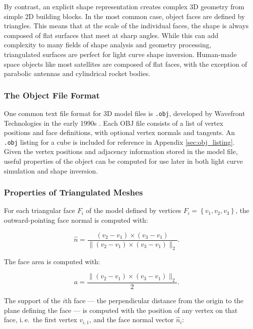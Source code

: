 By contrast, an explicit shape representation creates complex 3D geometry from simple 2D building blocks. In the most common case, object faces are defined by triangles. This means that at the scale of the individual faces, the shape is always composed of flat surfaces that meet at sharp angles. While this can add complexity to many fields of shape analysis and geometry processing, triangulated surfaces are perfect for light curve shape inversion. Human-made space objects like most satellites are composed of flat faces, with the exception of parabolic antennas and cylindrical rocket bodies.

\subsubsection{The Object File Format}

One common text file format for 3D model files is \texttt{.obj}, developed by Wavefront Technologies in the early 1990s \cite{obj_format}. Each OBJ file consists of a list of vertex positions and face definitions, with optional vertex normals and tangents. An \texttt{.obj} listing for a cube is included for reference in Appendix \ref{sec:obj_listing}. Given the vertex positions and adjacency information stored in the model file, useful properties of the object can be computed for use later in both light curve simulation and shape inversion. 

\subsubsection{Properties of Triangulated Meshes}

For each triangular face $F_i$ of the model defined by vertices $F_i = \left\{v_1, v_2, v_3\right\}$, the outward-pointing face normal is computed with:

\begin{equation} \label{eq:face_normal}
    \hat{n} = \frac{\left( v_2 - v_1 \right) \times \left( v_3 - v_1 \right)}{\| \left( v_2 - v_1 \right) \times \left( v_3 - v_1 \right) \|_2}.
\end{equation}

The face area is computed with:

\begin{equation} \label{eq:face_areas}
    a = \frac{\| \left( v_2 - v_1 \right) \times \left( v_3 - v_1 \right)\|_2}{2}.
\end{equation}

The support of the $i$th face --- the perpendicular distance from the origin to the plane defining the face --- is computed with the position of any vertex on that face, i.\,e.\, the first vertex $v_{i,1}$, and the face normal vector $\hat{n}_i$:

